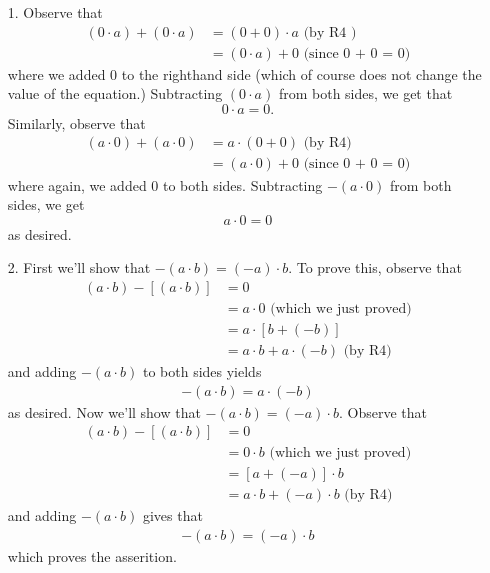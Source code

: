 \begin{prf}
    \begin{itemize}
        \item[1.] Observe that 
        \begin{align*}
            (0 \cdot a) + (0 \cdot a) &= (0 + 0) \cdot a \text{ (by R4 )}\\
            & = (0 \cdot a) + 0 \text{  (since 0 + 0 = 0)}
        \end{align*}
        where we added
        $0$ to the righthand side (which of course 
        does not change the value of the equation.) Subtracting
        $(0 \cdot a)$ from both sides, we get that 
        \[
            0 \cdot a  = 0.
        \]
        Similarly, observe that 
        \begin{align*}
            (a \cdot 0) + (a \cdot 0) & = a \cdot (0 + 0) \text{ (by R4)}\\
            & = (a \cdot 0)+ 0 \text{ (since 0 + 0 = 0)}
        \end{align*}
        where again, we added $0$ to both sides. Subtracting $-(a
        \cdot 0)$ from both sides, we get 
        \[
            a \cdot 0 = 0
        \]
        as desired. 
        
        \item[2.] First we'll show that $-(a \cdot b) = (-a) \cdot
        b$. To prove this, observe that 
        \begin{align*}
            (a \cdot b) - [(a \cdot b)] & = 0 \\
            & = a \cdot 0 \text{ (which we just proved)}\\
            & = a \cdot [b + (-b)]\\
            & = a \cdot b + a \cdot (-b) \text{ (by R4)}
        \end{align*}
        and adding $-(a \cdot b)$ to both sides yields 
        \begin{align*}
            -(a \cdot b) = a \cdot (-b)
        \end{align*}
        as desired. Now we'll show that $-(a \cdot b) = (-a) \cdot
        b$. Observe that 
        \begin{align*}
            (a \cdot b) - [(a \cdot b)] & = 0 \\
            & = 0 \cdot b \text{ (which we just proved)}\\
            & = [a + (-a)] \cdot b\\
            & = a \cdot b + (-a) \cdot b \text{ (by R4)}
        \end{align*}
        and adding $-(a \cdot b)$ gives that 
        \begin{align*}
            -(a \cdot b) = (-a) \cdot b
        \end{align*}
        which proves the asserition.


\end{itemize}
\end{prf}
